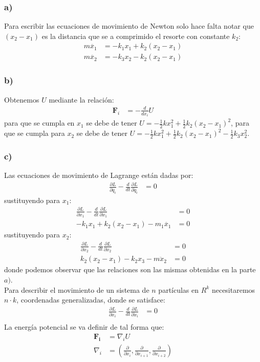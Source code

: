 \documentclass{article}
\begin{document}
\begin{tcolorbox}[breakable]
    \subsubsection*{a)}
    Para escribir las ecuaciones de movimiento de Newton solo hace falta notar que 
    $(x_2-x_1)$ es la distancia que se a comprimido el resorte con constante $k_2$:
    \begin{align*}
        m\ddot{x_1} &= -k_1x_1 + k_2(x_2-x_1) \\
        m\ddot{x_2} &= -k_3x_2 - k_2(x_2-x_1)
    \end{align*}
    \subsubsection*{b)}
    Obtenemos $U$ mediante la relación:
    \begin{align*}
        \bm{F}_i &= -\frac{d}{dx_i}U
    \end{align*}
    para que se cumpla en $x_1$ se debe de tener $U = -\frac{1}{2}kx_1^2+\frac{1}{2}k_2(x_2-x_1)^2$, para 
    que se cumpla para $x_2$ se debe de tener $U = -\frac{1}{2}kx_1^2+\frac{1}{2}k_2(x_2-x_1)^2-\frac{1}{2}k_3x_2^2$.
    \subsubsection*{c)}
    Las ecuaciones de movimiento de Lagrange están dadas por:
    \begin{align*}
        \frac{\partial L}{\partial q_i} - \frac{d}{dt}\frac{\partial L }{\partial \dot{q}_i} &= 0 
    \end{align*}
    sustituyendo para $x_1$:
    \begin{align*}
        \frac{\partial L}{\partial x_1} - \frac{d}{dt}\frac{\partial L }{\partial \dot{x}_1} &= 0 \\
        -k_1x_1+k_2(x_2-x_1) - m_1\ddot{x_1} &= 0  
    \end{align*}
    sustituyendo para $x_2$:
    \begin{align*}
        \frac{\partial L}{\partial x_2} - \frac{d}{dt}\frac{\partial L }{\partial \dot{x}_2} &= 0 \\
        k_2(x_2-x_1)-k_2x_3 - m\ddot{x}_2 &= 0 
    \end{align*}
    donde podemos observar que las relaciones son las mismas obtenidas en la parte $a)$. \\
    Para describir el movimiento de un sistema de $n$ partículas en $R^k$ necesitaremos $n \cdot k$, 
    coordenadas generalizadas, donde se satisface:
    \begin{align*}
        \frac{\partial L}{\partial x_i} - \frac{d}{dt}\frac{\partial L }{\partial \dot{x}_i} &= 0 \\
    \end{align*}
    La energía potencial se va definir de tal forma que:
    \begin{align*}
        \bm{F_i} &= \nabla_i U \\
        \nabla_i &= \left( \frac{\partial }{\partial x_i}, \frac{\partial }{\partial x_{i+1}}, \frac{\partial }{\partial x_{i+2}} \right)
    \end{align*}
    
\end{tcolorbox}
\end{document}
